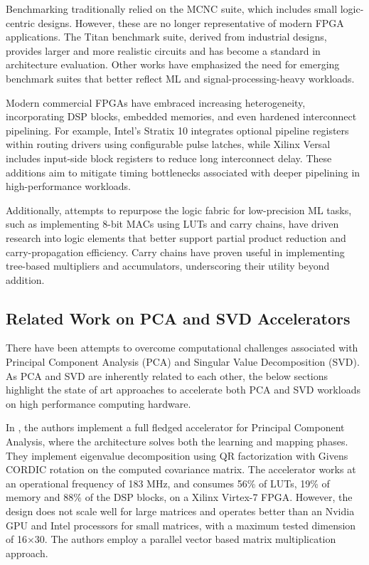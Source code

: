 Benchmarking traditionally relied on the MCNC suite\cite{yang1991logic}, which includes small logic-centric designs. However, these are no longer representative of modern FPGA applications. The Titan benchmark suite\cite{rose2012vtr}, derived from industrial designs, provides larger and more realistic circuits and has become a standard in architecture evaluation. Other works have emphasized the need for emerging benchmark suites that better reflect ML and signal-processing-heavy workloads.

Modern commercial FPGAs have embraced increasing heterogeneity, incorporating DSP blocks, embedded memories, and even hardened interconnect pipelining. For example, Intel’s Stratix 10 integrates optional pipeline registers within routing drivers using configurable pulse latches\cite{intel_stratix10_2019}, while Xilinx Versal includes input-side block registers to reduce long interconnect delay\cite{xilinx_versal_trm_2021}. These additions aim to mitigate timing bottlenecks associated with deeper pipelining in high-performance workloads.

Additionally, attempts to repurpose the logic fabric for low-precision ML tasks, such as implementing 8-bit MACs using LUTs and carry chains\cite{boutros2021fpga}, have driven research into logic elements that better support partial product reduction and carry-propagation efficiency. Carry chains have proven useful in implementing tree-based multipliers and accumulators, underscoring their utility beyond addition.

\subsection{Related Work on PCA and SVD Accelerators}
There have been attempts to overcome computational challenges associated with Principal Component Analysis (PCA) and Singular Value Decomposition (SVD). As PCA and SVD are inherently related to each other, the below sections highlight the state of art approaches to accelerate both PCA and SVD workloads on high performance computing hardware. 


In \cite{pca_architecture-1}, the authors implement a full fledged accelerator for Principal Component Analysis, where the architecture solves both the learning and mapping phases. They implement eigenvalue decomposition using QR factorization with Givens CORDIC rotation on the computed covariance matrix. The accelerator works at an operational frequency of 183 MHz, and consumes 56\% of LUTs, 19\% of memory and 88\% of the DSP blocks, on a Xilinx Virtex-7 FPGA. However, the design does not scale well for large matrices and operates better than an Nvidia GPU and Intel processors for small matrices, with a maximum tested dimension of 16×30. The authors employ a parallel vector based matrix multiplication approach. 


